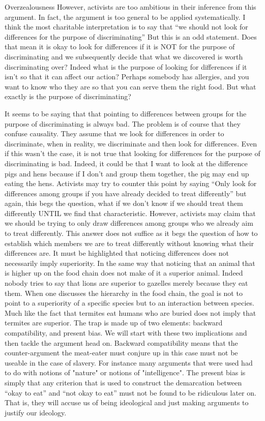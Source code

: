 Overzealousness
However, activists are too ambitious in their inference from this argument. In fact, the argument is too general to be applied systematically. I think the most charitable interpretation is to say that “we should not look for differences for the purpose of discriminating”
But this is an odd statement. Does that mean it is okay to look for differences if it is NOT for the purpose of discriminating and we subsequently decide that what we discovered is worth discriminating over? 
Indeed what is the purpose of looking for differences if it isn’t so that it can affect our action? Perhaps somebody has allergies, and you want to know who they are so that you can serve them the right food. 
But what exactly is the purpose of discriminating? 

 It seems to be saying that that pointing to differences between groups for the purpose of discriminating is always bad. The problem is of course that they confuse causality. They assume that we look for differences in order to discriminate, when in reality, we discriminate and then look for differences. 
Even if this wasn’t the case, it is not true that looking for differences for the purpose of discriminating is bad. Indeed, it could be that I want to look at the difference pigs and hens because if I don’t and group them together, the pig may end up eating the hens. 
Activists may try to counter this point by saying “Only look for differences among groups if you have already decided to treat differently” but again, this begs the question, what if we don’t know if we should treat them differently UNTIL we find that characteristic. 
However, activists may claim that we should be trying to only draw differences among groups who we already aim to treat differently. This answer does not suffice as it begs the question of how to establish which members we are to treat differently without knowing what their differences are.
It must be highlighted that noticing differences does not necessarily imply superiority. In the same way that noticing that an animal that is higher up on the food chain does not make of it a superior animal. Indeed nobody tries to say that lions are superior to gazelles merely because they eat them. When one discusses the hierarchy in the food chain, the goal is not to point to a superiority of a specific species but to an interaction between species. Much like the fact that termites eat humans who are buried does not imply that termites are superior.
The trap is made up of two elements: backward compatibility, and present bias. We will start with these two implications and then tackle the argument head on.
Backward compatibility means that the counter-argument the meat-eater must conjure up in this case must not be useable in the case of slavery. For instance many arguments that were used had to do with notions of "nature" or notions of "intelligence".
The present bias is simply that any criterion that is used to construct the demarcation between “okay to eat” and “not okay to eat” must not be found to be ridiculous later on. That is, they will accuse us of being ideological and just making arguments to justify our ideology.

